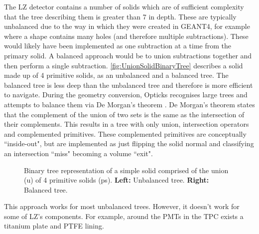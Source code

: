 \par
The LZ detector contains a number of solids which are of sufficient complexity that the tree describing them is greater than 7 in depth.
These are typically unbalanced due to the way in which they were created in GEANT4, for example where a shape contains many holes (and therefore multiple subtractions).
These would likely have been implemented as one subtraction at a time from the primary solid.
A balanced approach would be to union subtractions together and then perform a single subtraction.
\autoref{fig:UnionSolidBinaryTree} describes a solid made up of 4 primitive solids, as an unbalanced and a balanced tree.
The balanced tree is less deep than the unbalanced tree and therefore is more efficient to navigate.
During the geometry conversion, Opticks recognises large trees and attempts to balance them via De Morgan's theorem \cite{Opticks_CHEP_2019_ref}.
De Morgan's theorem states that the complement of the union of two sets is the same as the intersection of their complements.
This results in a tree with only union, intersection operators and complemented primitives.
These complemented primitives are conceptually ``inside-out", but are implemented as just flipping the solid normal and classifying an intersection ``miss" becoming a volume ``exit".
\begin{figure}
\centering 
{}
\caption{Binary tree representation of a simple solid comprised of the union (u) of 4 primitive solids (ps). \textbf{Left:} Unbalanced tree. \textbf{Right:} Balanced tree.}
\label{fig:UnionSolidBinaryTree}
\end{figure}
\par
This approach works for most unbalanced trees. 
However, it doesn't work for some of LZ's components.
For example, around the PMTs in the TPC exists a titanium plate and PTFE lining.
